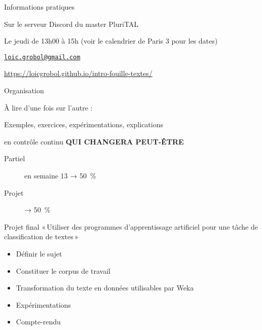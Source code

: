 \documentclass[../allslides.tex]{subfiles}
\begin{document}
\renewcommand\docdate{2021-01-28}  %


\begin{frame}{Informations pratiques}
	\begin{description}[*]
		\item[Où] Sur le serveur Discord du master PluriTAL
		\item[Quand] Le jeudi de 13h00 à 15h (voir le calendrier de Paris 3 pour les dates)
		\item[Email] \href{mailto:loic.grobol@gmail.com}{\texttt{loic.grobol@gmail.com}}
		\item[Web] \url{https://loicgrobol.github.io/intro-fouille-textes/}
	\end{description}
\end{frame}

\begin{frame}{Organisation}
	\begin{description}[*]
		\item[Poly] À lire d'une fois sur l'autre :\\
			{\footnotesize{}}
		\item[Cours] Exemples, exercices, expérimentations, explications
		\item[Évaluation] en contrôle continu \textbf{QUI CHANGERA PEUT-ÊTRE}
			\begin{description}
				\item[Partiel] en semaine 13 → \SI{50}{\percent}
				\item[Projet] → \SI{50}{\percent}
			\end{description}
	\end{description}
\end{frame}

\begin{frame}{Projet final}
	« Utiliser des programmes d'apprentissage artificiel pour une tâche de classification de textes »
	\begin{itemize}
		\item Définir le sujet
		\item Constituer le corpus de travail
		\item Transformation du texte en données utilisables par Weka
		\item Expérimentations
		\item Compte-rendu
	\end{itemize}
\end{frame}
\end{document}
